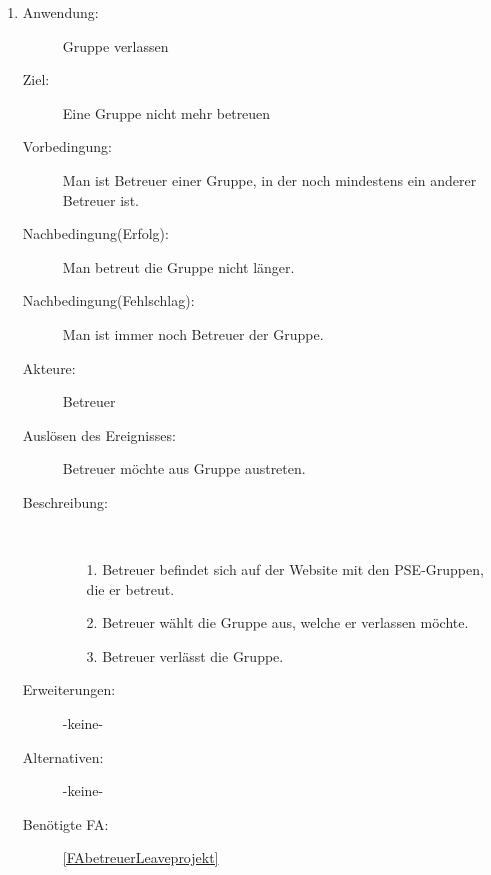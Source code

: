 \documentclass[parskip=full]{scrartcl}
\newcommand{\swtLabel}[1]{\textbf{/#1\arabic*0/}}
\begin{document}
\begin{enumerate} [label=\swtLabel{B}]
  
  \item \label{UCbetreuerLeaveProjekt}
	\begin{description}
  		\item[Anwendung:] Gruppe verlassen
  		\item[Ziel:] Eine Gruppe nicht mehr betreuen
  		\item[Vorbedingung:] Man ist Betreuer einer Gruppe, in der noch mindestens
  		ein anderer Betreuer ist.
  		\item[Nachbedingung(Erfolg):] Man betreut die Gruppe nicht länger.
  		\item[Nachbedingung(Fehlschlag):] Man ist immer noch Betreuer der Gruppe.
  		\item[Akteure:] Betreuer
  		\item[Auslösen des Ereignisses:] Betreuer möchte aus Gruppe austreten.
  		\item[Beschreibung:]~
  	\begin{enumerate} 
  	  \item[1.] Betreuer befindet sich auf der Website mit den \gls{PSE}-Gruppen, die
  	  er betreut.
  	  \item[2.] Betreuer wählt die Gruppe aus, welche er verlassen möchte.
  	  \item[3.] Betreuer verlässt die Gruppe.
  	\end{enumerate}
  	\item[Erweiterungen:] -keine-
  	\item[Alternativen:] -keine-
  	\item[Benötigte FA:] \ref{FAbetreuerLeaveprojekt}
  \end{description}
   

\end{enumerate}
\end{document}
